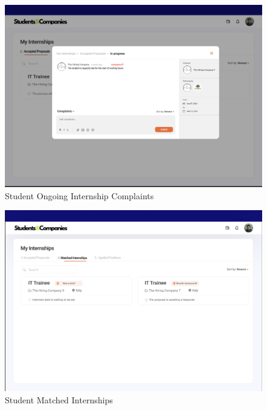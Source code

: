 \documentclass{article}
\begin{document}
\begin{figure}[H]
    \centering
    \includegraphics[scale = 0.42]{figures/UserInterfaces/Student/StudentComplaints.png}
    \caption{Student Ongoing Internship Complaints}
     \centering
\end{figure}
\begin{figure}[H]
    \centering
    \includegraphics[scale = 0.42]{figures/UserInterfaces/Student/MatchedInternships.png}
    \caption{Student Matched Internships}
     \centering
\end{figure}
\end{document}
